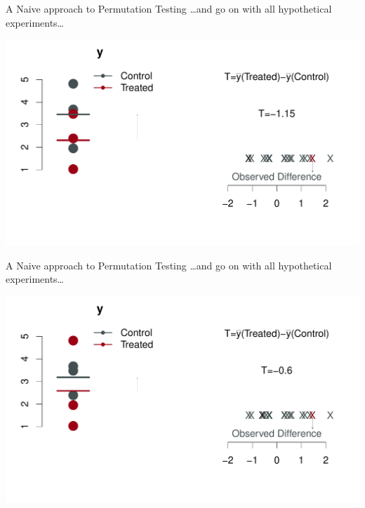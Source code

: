 \begin{frame}{A Naive approach to Permutation Testing}
 \ldots and go on with all hypothetical experiments\ldots 
\begin{center}
\includegraphics[width=1.1\textwidth]{figures/permsslides16} 
\end{center}
\end{frame}


\begin{frame}{A Naive approach to Permutation Testing}
 \ldots and go on with all hypothetical experiments\ldots 
\begin{center}
\includegraphics[width=1.1\textwidth]{figures/permsslides17} 
\end{center}
\end{frame}


